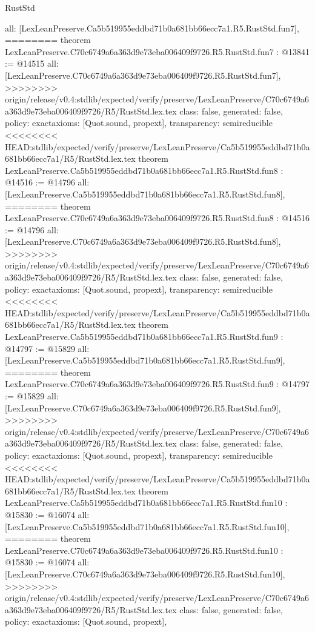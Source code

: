 \begin{lexlean}{RustStd}
\begin{coremodule}
{\begin{coremodule}
{{{{{{{{{{  all: [LexLeanPreserve.Ca5b519955eddbd71b0a681bb66ecc7a1.R5.RustStd.fun7],
========
theorem LexLeanPreserve.C70c6749a6a363d9e73eba006409f9726.R5.RustStd.fun7 : @13841 := @14515 {
  all: [LexLeanPreserve.C70c6749a6a363d9e73eba006409f9726.R5.RustStd.fun7],
>>>>>>>> origin/release/v0.4:stdlib/expected/verify/preserve/LexLeanPreserve/C70c6749a6a363d9e73eba006409f9726/R5/RustStd.lex.tex
  class: false,
  generated: false,
  policy: exact{axioms: [Quot.sound, propext]},
  transparency: semireducible
}
<<<<<<<< HEAD:stdlib/expected/verify/preserve/LexLeanPreserve/Ca5b519955eddbd71b0a681bb66ecc7a1/R5/RustStd.lex.tex
theorem LexLeanPreserve.Ca5b519955eddbd71b0a681bb66ecc7a1.R5.RustStd.fun8 : @14516 := @14796 {
  all: [LexLeanPreserve.Ca5b519955eddbd71b0a681bb66ecc7a1.R5.RustStd.fun8],
========
theorem LexLeanPreserve.C70c6749a6a363d9e73eba006409f9726.R5.RustStd.fun8 : @14516 := @14796 {
  all: [LexLeanPreserve.C70c6749a6a363d9e73eba006409f9726.R5.RustStd.fun8],
>>>>>>>> origin/release/v0.4:stdlib/expected/verify/preserve/LexLeanPreserve/C70c6749a6a363d9e73eba006409f9726/R5/RustStd.lex.tex
  class: false,
  generated: false,
  policy: exact{axioms: [Quot.sound, propext]},
  transparency: semireducible
}
<<<<<<<< HEAD:stdlib/expected/verify/preserve/LexLeanPreserve/Ca5b519955eddbd71b0a681bb66ecc7a1/R5/RustStd.lex.tex
theorem LexLeanPreserve.Ca5b519955eddbd71b0a681bb66ecc7a1.R5.RustStd.fun9 : @14797 := @15829 {
  all: [LexLeanPreserve.Ca5b519955eddbd71b0a681bb66ecc7a1.R5.RustStd.fun9],
========
theorem LexLeanPreserve.C70c6749a6a363d9e73eba006409f9726.R5.RustStd.fun9 : @14797 := @15829 {
  all: [LexLeanPreserve.C70c6749a6a363d9e73eba006409f9726.R5.RustStd.fun9],
>>>>>>>> origin/release/v0.4:stdlib/expected/verify/preserve/LexLeanPreserve/C70c6749a6a363d9e73eba006409f9726/R5/RustStd.lex.tex
  class: false,
  generated: false,
  policy: exact{axioms: [Quot.sound, propext]},
  transparency: semireducible
}
<<<<<<<< HEAD:stdlib/expected/verify/preserve/LexLeanPreserve/Ca5b519955eddbd71b0a681bb66ecc7a1/R5/RustStd.lex.tex
theorem LexLeanPreserve.Ca5b519955eddbd71b0a681bb66ecc7a1.R5.RustStd.fun10 : @15830 := @16074 {
  all: [LexLeanPreserve.Ca5b519955eddbd71b0a681bb66ecc7a1.R5.RustStd.fun10],
========
theorem LexLeanPreserve.C70c6749a6a363d9e73eba006409f9726.R5.RustStd.fun10 : @15830 := @16074 {
  all: [LexLeanPreserve.C70c6749a6a363d9e73eba006409f9726.R5.RustStd.fun10],
>>>>>>>> origin/release/v0.4:stdlib/expected/verify/preserve/LexLeanPreserve/C70c6749a6a363d9e73eba006409f9726/R5/RustStd.lex.tex
  class: false,
  generated: false,
  policy: exact{axioms: [Quot.sound, propext]},
}}}}}}}}}}}}}}
\end{coremodule}}
\end{coremodule}
\end{lexlean}
